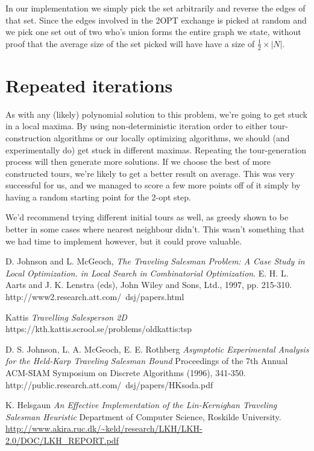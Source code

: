 \documentclass[a4paper,12pt,oneside]{article}
\begin{document}
In our implementation we simply pick the set arbitrarily and reverse the edges of that set. Since the edges involved in the 2OPT exchange is picked at random and we pick one set out of two who's union forms the entire graph we state, without proof that the average size of the set picked will have have a size of $\frac{1}{2} \times |N|$.


\section{Repeated iterations}

As with any (likely) polynomial solution to this problem, we're going to get stuck in a local maxima. By using non-deterministic iteration order to either tour-construction algorithms or our locally optimizing algorithms, we should (and experimentally do) get stuck in different maximas. Repeating the tour-generation process will then generate more solutions. If we choose the best of more constructed tours, we're likely to get a better result on average. This was very successful for us, and we managed to score a few more points off of it simply by having a random starting point for the 2-opt step.

We'd recommend trying different initial tours as well, as greedy shown to be better in some cases where nearest neighbour didn't. This wasn't something that we had time to implement however, but it could prove valuable.

\begin{thebibliography}{9}

	D. Johnson and L. McGeoch,
	\emph{The Traveling Salesman Problem: A Case Study in Local Optimization. in Local Search in Combinatorial Optimization}.
	E. H. L. Aarts and J. K. Lenstra (eds), John Wiley and Sons, Ltd., 1997, pp. 215-310. http://www2.research.att.com/~dsj/papers.html

	Kattis
	\emph{Travelling Salesperson 2D}
	https://kth.kattis.scrool.se/problems/oldkattis:tsp

	D. S. Johnson, L. A. McGeoch, E. E. Rothberg
	\emph{Asymptotic Experimental Analysis for the Held-Karp Traveling Salesman Bound}
	Proceedings of the 7th Annual ACM-SIAM Symposium on Discrete Algorithms (1996), 341-350. http://public.research.att.com/~dsj/papers/HKsoda.pdf

	K. Helsgaun
	\emph{An Effective Implementation of the Lin-Kernighan Traveling Salesman Heuristic}
	Department of Computer Science, Roskilde University. \url{http://www.akira.ruc.dk/~keld/research/LKH/LKH-2.0/DOC/LKH_REPORT.pdf}
\end{thebibliography}
\end{document}
